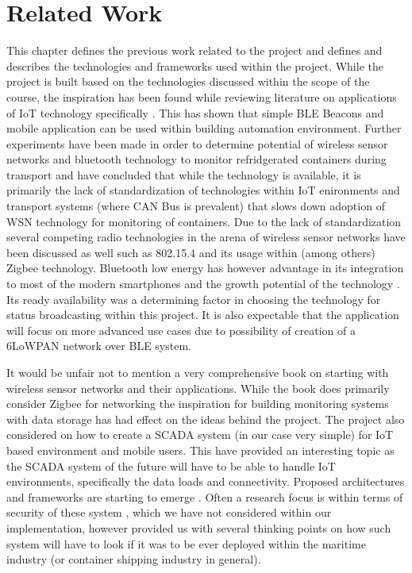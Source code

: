 \chapter{Related Work}
\label{cha:related-work}


This chapter defines the previous work related to the project and defines and describes the technologies and frameworks used within the project. While the project is built based on the technologies discussed within the scope of the course, the inspiration has been found while reviewing literature on applications of IoT technology specifically \cite{7396510}. This has shown that simple BLE Beacons and mobile application can be used within building automation environment. Further experiments have been made in order to determine potential of wireless sensor networks and bluetooth technology to monitor refridgerated containers during transport \citep{SJAR234} and have concluded that while the technology is available, it is primarily the lack of standardization of technologies within IoT enironments and transport systems (where CAN Bus is prevalent) that slows down adoption of WSN technology for monitoring of containers. Due to the lack of standardization several competing radio technologies in the arena of wireless sensor networks have been discussed as well such as 802.15.4 and its usage within (among others) Zigbee technology. Bluetooth low energy has however advantage in its integration to most of the modern smartphones and the growth potential of the technology \citep{statista}. Its ready availability was a determining factor in choosing the technology for status broadcasting within this project. It is also expectable that the application will focus on more advanced use cases due to possibility of creation of a 6LoWPAN \citep{RFC7668} \citep{article} network over BLE system. 

\bigskip

It would be unfair not to mention a very comprehensive book \citep{Bell2013:978-1-4302-5825-4} on starting with wireless sensor networks and their applications. While the book does primarily consider Zigbee for networking the inspiration for building monitoring systems with data storage has had effect on the ideas behind the project. The project also considered on how to create a SCADA system (in our case very simple) for IoT based environment and mobile users. This have provided an interesting topic as the SCADA system of the future will have to be able to handle IoT environments, specifically the data loads and connectivity. Proposed architectures and frameworks are starting to emerge \citep{unknown}. Often a research focus is within terms of security of these system \citep{article2}, which we have not considered within our implementation, however provided us with several thinking points on how such system will have to look if it was to be ever deployed within the maritime industry (or container shipping industry in general).

